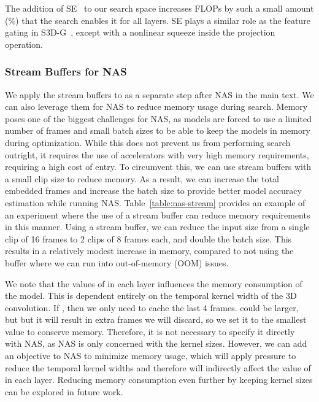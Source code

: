 \documentclass[final]{cvpr}
\begin{document}
The addition of SE~\cite{hu2018squeeze} to our search space increases FLOPs by such a small amount (\%) that the search enables it for all layers.
SE plays a similar role as the feature gating in S3D-G~\cite{xie2017rethinking}, except with a nonlinear squeeze inside the projection operation.



\subsubsection{Stream Buffers for NAS}
We apply the stream buffers to \ournets as a separate step after NAS in the main text.
We can also leverage them for NAS to reduce memory usage during search.
Memory poses one of the biggest challenges for NAS, as models are forced to use a limited number of frames and small batch sizes to be able to keep the models in memory during optimization.
While this does not prevent us from performing search outright, it requires the use of accelerators with very high memory requirements, requiring a high cost of entry.
To circumvent this, we can use stream buffers with a small clip size to reduce memory. 
As a result, we can increase the total embedded frames and increase the batch size to provide better model accuracy estimation while running NAS.
Table~\ref{table:nas-stream} provides an example of an experiment where the use of a stream buffer can reduce memory requirements in this manner.
Using a stream buffer, we can reduce the input size from a single clip of 16 frames to 2 clips of 8 frames each, and double the batch size.
This results in a relatively modest increase in memory, compared to not using the buffer where we can run into out-of-memory (OOM) issues.

We note that the values of  in each layer influences the memory consumption of the model.
This is dependent entirely on the temporal kernel width of the 3D convolution.
If , then we only need to cache the last 4 frames. 
 could be larger, but but it will result in extra frames we will discard, so we set it to the smallest value to conserve memory.
Therefore, it is not necessary to specify it directly with NAS, as NAS is only concerned with the kernel sizes.
However, we can add an objective to NAS to minimize memory usage, which will apply pressure to reduce the temporal kernel widths and therefore will indirectly affect the value of  in each layer. 
Reducing memory consumption even further by keeping kernel sizes can be explored in future work.
\end{document}
